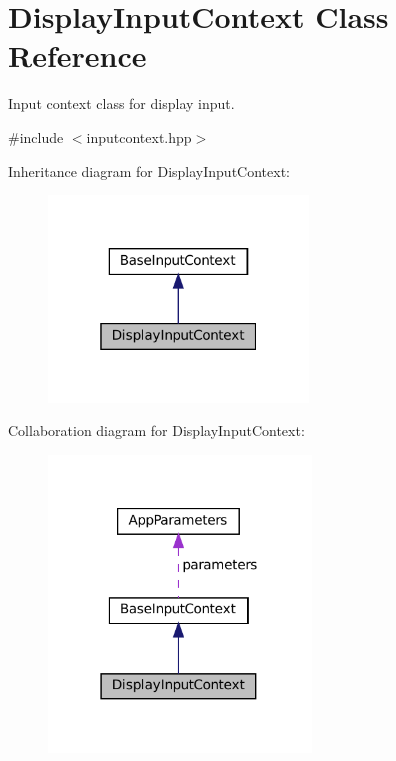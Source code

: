 \hypertarget{classDisplayInputContext}{}\section{Display\+Input\+Context Class Reference}
\label{classDisplayInputContext}


Input context class for display input.  




{\ttfamily \#include $<$inputcontext.\+hpp$>$}



Inheritance diagram for Display\+Input\+Context\+:\nopagebreak
\begin{figure}[H]
\begin{center}
\leavevmode
\includegraphics[width=196pt]{classDisplayInputContext__inherit__graph}
\end{center}
\end{figure}


Collaboration diagram for Display\+Input\+Context\+:\nopagebreak
\begin{figure}[H]
\begin{center}
\leavevmode
\includegraphics[width=198pt]{classDisplayInputContext__coll__graph}
\end{center}
\end{figure}
